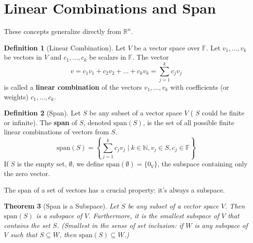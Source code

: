 \documentclass[11pt]{article}
\newtheorem{theorem}{Theorem}[section]
\theoremstyle{definition}
\newtheorem{definition}[theorem]{Definition}
\newcommand{\F}{\mathbb{F}}
\newcommand{\R}{\mathbb{R}}
\newcommand{\N}{\mathbb{N}}
\newcommand{\Span}[1]{\text{span}(#1)}
\begin{document}
\section{Linear Combinations and Span}

These concepts generalize directly from $\R^n$.

\begin{definition}[Linear Combination]
Let $V$ be a vector space over $\F$. Let $v_1, \dots, v_k$ be vectors in $V$ and $c_1, \dots, c_k$ be scalars in $\F$. The vector
\[ v = c_1 v_1 + c_2 v_2 + \dots + c_k v_k = \sum_{j=1}^k c_j v_j \]
is called a \textbf{linear combination} of the vectors $v_1, \dots, v_k$ with coefficients (or weights) $c_1, \dots, c_k$.
\end{definition}

\begin{definition}[Span]
Let $S$ be any subset of a vector space $V$ ( $S$ could be finite or infinite). The \textbf{span} of $S$, denoted $\Span{S}$, is the set of all possible finite linear combinations of vectors from $S$.
\[ \Span{S} = \left\{ \sum_{j=1}^k c_j v_j \mid k \in \N, v_j \in S, c_j \in \F \right\} \]
If $S$ is the empty set, $\emptyset$, we define $\Span{\emptyset} = \{0_V\}$, the subspace containing only the zero vector.
\end{definition}

The span of a set of vectors has a crucial property: it's always a subspace.

\begin{theorem}[Span is a Subspace]
Let $S$ be any subset of a vector space $V$. Then $\Span{S}$ is a subspace of $V$. Furthermore, it is the \emph{smallest} subspace of $V$ that contains the set $S$. (Smallest in the sense of set inclusion: if $W$ is any subspace of $V$ such that $S \subseteq W$, then $\Span{S} \subseteq W$.)
\end{theorem}
\end{document}
